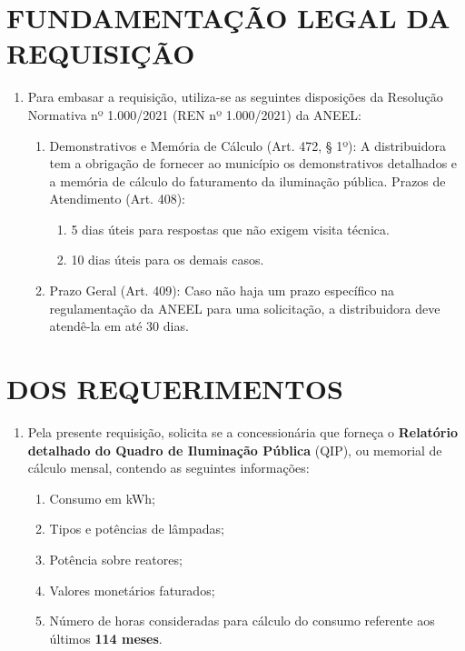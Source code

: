 \newcommand{\tipoRequerimento}{Solicitação do Quadro de Iluminação Pública}

\section{FUNDAMENTAÇÃO LEGAL DA REQUISIÇÃO}

\begin{enumerate}[resume]
\item
  Para embasar a requisição, utiliza-se as seguintes disposições da Resolução Normativa nº 1.000/2021 (REN nº 1.000/2021) da ANEEL:
  \begin{enumerate}
  \item
    Demonstrativos e Memória de Cálculo (Art. 472, § 1º): A distribuidora tem a obrigação de fornecer ao município os demonstrativos detalhados e a memória de cálculo do faturamento da iluminação pública. Prazos de Atendimento (Art. 408):
    \begin{enumerate}
      \item  
      5 dias úteis para respostas que não exigem visita técnica.
      \item 
      10 dias úteis para os demais casos.
    \end{enumerate}
  \item 
  Prazo Geral (Art. 409): Caso não haja um prazo específico na regulamentação da ANEEL para uma solicitação, a distribuidora deve atendê-la em até 30 dias.
  \end{enumerate}
\end{enumerate}

\section{DOS REQUERIMENTOS}

\begin{enumerate}[resume]
\item Pela presente requisição, solicita se a concessionária que forneça o \textbf{Relatório detalhado do Quadro de Iluminação Pública} (QIP), ou memorial de cálculo mensal, contendo as seguintes informações: 
\begin{enumerate}
  \item Consumo em kWh;
  \item Tipos e potências de lâmpadas;
  \item Potência sobre reatores;
  \item Valores monetários faturados;
  \item Número de horas consideradas para cálculo do consumo referente aos últimos \textbf{114 meses}.
\end{enumerate}
\end{enumerate}


